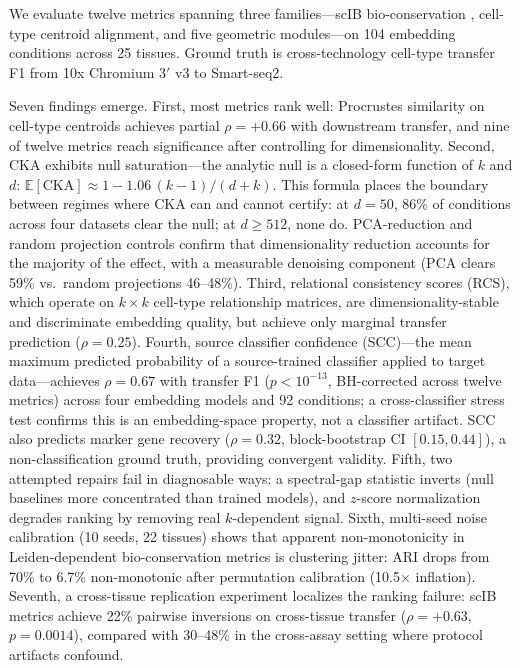 \documentclass[11pt]{article}
\begin{document}
We evaluate twelve metrics spanning three families---scIB
bio-conservation \citep{luecken2022scib}, cell-type centroid alignment,
and five geometric modules---on 104 embedding conditions across 25
tissues. Ground truth is cross-technology cell-type transfer F1 from
10x Chromium 3$'$ v3 to Smart-seq2.

Seven findings emerge. First, most metrics rank well: Procrustes
similarity on cell-type centroids achieves partial $\rho = +0.66$ with
downstream transfer, and nine of twelve metrics reach significance after
controlling for dimensionality. Second, CKA exhibits null saturation---the
analytic null is a closed-form function of $k$ and $d$:
$\mathbb{E}[\mathrm{CKA}] \approx 1 - 1.06\,(k{-}1)/(d{+}k)$. This
formula places the boundary between regimes where CKA can and cannot
certify: at $d = 50$, 86\% of conditions across four datasets clear the
null; at $d \geq 512$, none do. PCA-reduction and random projection
controls confirm that dimensionality reduction accounts for the majority
of the effect, with a measurable denoising component (PCA clears 59\%
vs.\ random projections 46--48\%). Third, relational consistency scores
(RCS), which operate on $k \times k$ cell-type relationship matrices,
are dimensionality-stable and discriminate embedding quality, but
achieve only marginal transfer prediction ($\rho = 0.25$). Fourth,
source classifier confidence (SCC)---the mean maximum predicted
probability of a source-trained classifier applied to target
data---achieves $\rho = 0.67$ with transfer F1 ($p < 10^{-13}$,
BH-corrected across twelve metrics) across four embedding models and
92 conditions; a cross-classifier stress test confirms this is an
embedding-space property, not a classifier artifact. SCC also predicts
marker gene recovery ($\rho = 0.32$, block-bootstrap CI
$[0.15, 0.44]$), a non-classification ground truth, providing
convergent validity. Fifth, two attempted
repairs fail in diagnosable ways: a spectral-gap statistic inverts
(null baselines more concentrated than trained models),
and $z$-score normalization degrades ranking by removing real
$k$-dependent signal. Sixth, multi-seed noise calibration (10 seeds, 22
tissues) shows that apparent non-monotonicity in Leiden-dependent
bio-conservation metrics is clustering jitter: ARI drops from 70\% to
6.7\% non-monotonic after permutation calibration (10.5$\times$
inflation). Seventh, a cross-tissue replication experiment localizes the
ranking failure: scIB metrics achieve 22\% pairwise inversions on
cross-tissue transfer ($\rho = +0.63$, $p = 0.0014$), compared with
30--48\% in the cross-assay setting where protocol artifacts confound.
\end{document}

